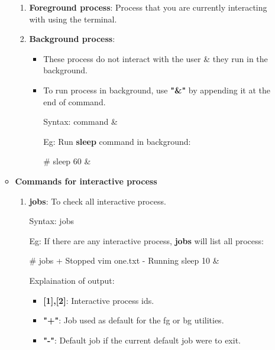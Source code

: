\begin{flushleft}
\begin{enumerate}
\begin{itemize}
		\begin{enumerate}
			\item \textbf{Foreground process}: Process that you are currently interacting with using the terminal.
			\item \textbf{Background process}: 
			\begin{itemize}
				\item These process do not interact with the user \& they run in the background.
				\item To run process in background, use \textbf{"\&"} by appending it at the end of command.
				\bigskip
				\begin{tcolorbox}[breakable,notitle,boxrule=-0pt,colback=pink,colframe=pink]
					\color{black}
					\font=9pt
					Syntax: command \&
					\font=4pt
				\end{tcolorbox}
				Eg: Run \textbf{sleep} command in background:
				\begin{tcolorbox}[breakable,notitle,boxrule=-0pt,colback=black,colframe=black]
					\color{green}
					\fontdimen2\font=9pt
					\#  sleep 60 \&
					\fontdimen2\font=4pt
				\end{tcolorbox}
			\end{itemize}
		\end{enumerate}
		
		\newpage
		
		
		
		\item \textbf{Commands for interactive process}
		\begin{enumerate}
			\item \textbf{jobs}: To check all interactive process.
			\bigskip
			\begin{tcolorbox}[breakable,notitle,boxrule=-0pt,colback=pink,colframe=pink]
				\color{black}
				\fontdimen2\font=9pt
				Syntax: jobs
				\fontdimen2\font=4pt
			\end{tcolorbox}
			
			Eg: If there are any interactive process, \textbf{jobs} will list all process:
			\begin{tcolorbox}[breakable,notitle,boxrule=-0pt,colback=black,colframe=black]
				\color{green}
				\font=9pt
				\#  jobs
				\color{white}
				\newline
				[1]+  Stopped                 vim one.txt
				\newline
				[2]-  Running                 sleep 10 \&
				\font=4pt
			\end{tcolorbox}
			Explaination of output:
			\begin{itemize}
				\item \textbf{[1],[2]}: Interactive process ids.
				\item \textbf{"+"}: Job used as default for the fg or bg utilities. 
				\item \textbf{"-"}: Default job if the current default job were to exit.
			\end{itemize}	
			

\end{enumerate}
\end{itemize}
\end{enumerate}
\end{flushleft}
